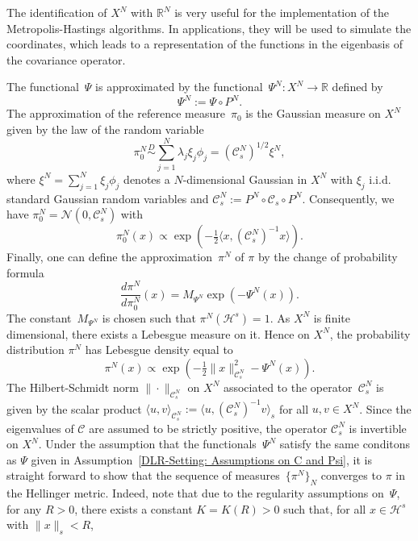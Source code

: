 \begin{rem}
 The identification of $X^N$ with $\mathbb{R}^N$ is very useful for the implementation of the Metropolis-Hastings algorithms. In applications, they will be used to simulate the coordinates, which leads to a representation of the functions in the eigenbasis of the covariance operator.
\end{rem}

The functional~$\Psi$ is approximated by the functional~$\Psi^N : X^N \to \mathbb{R}$ defined by
\begin{equation}
\label{DLR-Setting: Definition Psi^N}
 \Psi^N := \Psi \circ P^N.
\end{equation}
The approximation of the reference measure~$\pi_0$ is the Gaussian measure on $X^N$ given by the law of the random variable
\begin{equation*}
 \pi^N_0 \stackrel{D}{\sim} \sum_{j=1}^{N} \lambda_j \xi_j \phi_j = (\mathcal{C}^N_s)^{1/2} \xi^N, 
\end{equation*}
where $\xi^N = \sum_{j=1}^{N} \xi_j \phi_j$ denotes a $N$-dimensional Gaussian in $X^N$ with $\xi_j$ i.i.d.\,standard Gaussian random variables and  $\mathcal{C}_s^N :=P^N \circ \mathcal{C}_s \circ P^N $. Consequently, we have $\pi_0^N = \mathcal{N}(0, \mathcal{C}_s^N)$ with
\begin{equation*}
 \pi_0^N (x) \varpropto \exp (- \tfrac{1}{2} \langle x, (\mathcal{C}^N_s)^{-1} x \rangle).
\end{equation*}
Finally, one can define the approximation~$\pi^N$ of $\pi$ by the change of probability formula
\begin{equation}
\label{DLR-Setting: Definition of pi^N}
 \frac{d \pi^N}{d \pi_0^N} (x) = M_{\Psi^N} \exp (- \Psi^N (x)).
\end{equation}
The constant~$M_{\Psi^N}$ is chosen such that $\pi^N (\mathcal{H}^s) =1$. As $X^N$ is finite dimensional, there exists a Lebesgue measure on it. Hence on $X^{N}$, the probability distribution $\pi^{N}$ has Lebesgue density equal to
\begin{equation}
\label{DLR-Setting: Definition finite dim target measure pi^N}
 \pi^N (x) \varpropto \exp (-\tfrac{1}{2} \| x \|^2_{\mathcal{C}_s^N} - \Psi^N (x)).
\end{equation}
The Hilbert-Schmidt norm  $ \| \cdot \|_{\mathcal{C}_s^{N}} $ on $X^{N}$ associated to the operator~$\mathcal{C}^N_s$ is given by the scalar product $ \langle u, v \rangle_{\mathcal{C}_s^{N}} := \langle u, ( \mathcal{C}_s^{N} )^{-1} v \rangle_s $ for all $ u,v \in X^{N} $. Since the eigenvalues of $ \mathcal{C} $ are assumed to be strictly positive, the operator $ \mathcal{C}_s^{N} $ is invertible on $X^{N}$. Under the assumption that the functionals~$\Psi^N$ satisfy the same conditons as $\Psi$ given in Assumption~\ref{DLR-Setting: Assumptions on C and Psi}, it is straight forward to show that the sequence of measures~$\{ \pi^N \}_N$ converges to $\pi$ in the Hellinger metric. Indeed, note that due to the regularity assumptions on~$\Psi$, for any $R>0$, there exists a constant $K=K(R)>0$ such that, for all $x\in \mathcal{H}^s$ with $\|x\|_s < R$,

